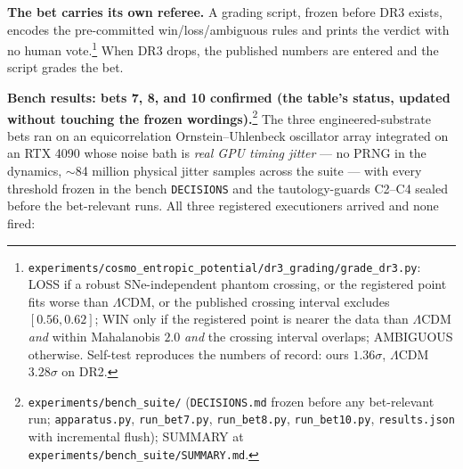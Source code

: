 \documentclass[11pt,a4paper]{article}
\begin{document}
\textbf{The bet carries its own referee.} A grading script, frozen before DR3 exists, encodes the pre-committed win/loss/ambiguous rules and prints the verdict with no human vote.\footnote{\texttt{experiments/cosmo\_entropic\_potential/dr3\_grading/grade\_dr3.py}: LOSS if a robust SNe-independent phantom crossing, or the registered point fits worse than $\Lambda$CDM, or the published crossing interval excludes $[0.56, 0.62]$; WIN only if the registered point is nearer the data than $\Lambda$CDM \emph{and} within Mahalanobis $2.0$ \emph{and} the crossing interval overlaps; AMBIGUOUS otherwise. Self-test reproduces the numbers of record: ours $1.36\sigma$, $\Lambda$CDM $3.28\sigma$ on DR2.} When DR3 drops, the published numbers are entered and the script grades the bet.

\textbf{Bench results: bets 7, 8, and 10 confirmed (the table's status, updated without touching the frozen wordings).}\footnote{\texttt{experiments/bench\_suite/} (\texttt{DECISIONS.md} frozen before any bet-relevant run; \texttt{apparatus.py}, \texttt{run\_bet7.py}, \texttt{run\_bet8.py}, \texttt{run\_bet10.py}, \texttt{results.json} with incremental flush); SUMMARY at \texttt{experiments/bench\_suite/SUMMARY.md}.} The three engineered-substrate bets ran on an equicorrelation Ornstein--Uhlenbeck oscillator array integrated on an RTX 4090 whose noise bath is \emph{real GPU timing jitter} --- no PRNG in the dynamics, $\sim$84 million physical jitter samples across the suite --- with every threshold frozen in the bench \texttt{DECISIONS} and the tautology-guards C2--C4 sealed before the bet-relevant runs. All three registered executioners arrived and none fired:
\end{document}
